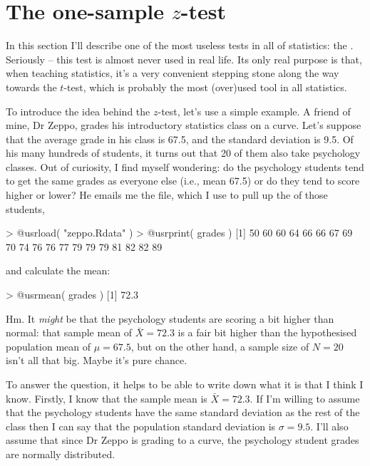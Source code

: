 \section{The one-sample $z$-test}

In this section I'll describe one of the most useless tests in all of statistics: the . Seriously -- this test is almost never used in real life. Its only real purpose is that, when teaching statistics, it's a very convenient stepping stone along the way towards the $t$-test, which is probably the most (over)used tool in all statistics.


To introduce the idea behind the $z$-test, let's use a simple example. A friend of mine, Dr Zeppo, grades his introductory statistics class on a curve. Let's suppose that the average grade in his class is 67.5, and the standard deviation is 9.5. Of his many hundreds of students, it turns out that 20 of them also take psychology classes. Out of curiosity, I find myself wondering: do the psychology students tend to get the same grades as everyone else (i.e., mean 67.5) or do they tend to score higher or lower? He emails me the  file, which I use to pull up the  of those students, 
\begin{rblock1}
> @usr{load( "zeppo.Rdata" )} 
> @usr{print( grades )}
 [1] 50 60 60 64 66 66 67 69 70 74 76 76 77 79 79 79 81 82 82 89
\end{rblock1} 
and calculate the mean:
\begin{rblock1}
> @usr{mean( grades )}
[1] 72.3
\end{rblock1}
Hm. It {\it might} be that the psychology students are scoring a bit higher than normal: that sample mean of $\bar{X} = 72.3$ is a fair bit higher than the hypothesised population mean of $\mu = 67.5$, but on the other hand, a sample size of $N = 20$ isn't all that big. Maybe it's pure chance. 

To answer the question, it helps to be able to write down what it is that I think I know. Firstly, I know that the sample mean is $\bar{X} = 72.3$. If I'm willing to assume that the psychology students have the same standard deviation as the rest of the class then I can say that the population standard deviation is $\sigma = 9.5$. I'll also assume that since Dr Zeppo is grading to a curve, the psychology student grades are normally distributed. 

